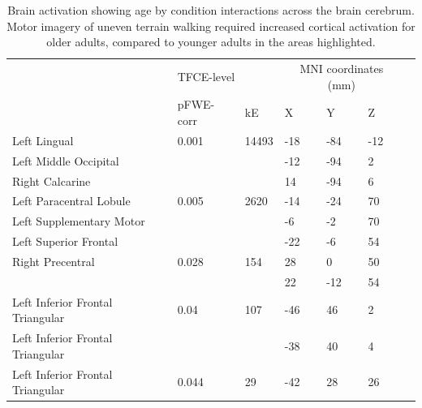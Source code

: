 \documentclass[a4paper,fleqn]{cas-sc}
\begin{document}
\begin{table}[h]
\centering
\caption{Brain activation showing age by condition interactions across the brain cerebrum. Motor imagery of uneven terrain walking required increased cortical activation for older adults, compared to younger adults in the areas highlighted. }
    \label{tab:MI_cerebrum_interaction}
\begin{tabular}{lllllll}

               & \multicolumn{2}{l}{TFCE-level} & \multicolumn{3}{c}{MNI coordinates (mm)} &  \\
& pFWE-corr        & kE          & X            & Y           & Z           &  \\ 
Left Lingual                             & 0.001            & 14493       & -18          & -84         & -12         &  \\
Left Middle Occipital                    &                  &             & -12          & -94         & 2           &  \\
Right Calcarine                          &                  &             & 14           & -94         & 6           &  \\
Left Paracentral Lobule                  & 0.005            & 2620        & -14          & -24         & 70          &  \\
Left Supplementary Motor                 &                  &             & -6           & -2          & 70          &  \\
Left Superior Frontal                    &                  &             & -22          & -6          & 54          &  \\
Right Precentral                         & 0.028            & 154         & 28           & 0           & 50          &  \\
\cellcolor[HTML]{D0CECE}                 &                  &             & 22           & -12         & 54          &  \\
Left Inferior Frontal Triangular         & 0.04             & 107         & -46          & 46          & 2           &  \\
Left Inferior Frontal Triangular         &                  &             & -38          & 40          & 4           &  \\
Left Inferior Frontal Triangular         & 0.044            & 29          & -42          & 28          & 26          &  
\end{tabular}
\end{table}
\end{document}
